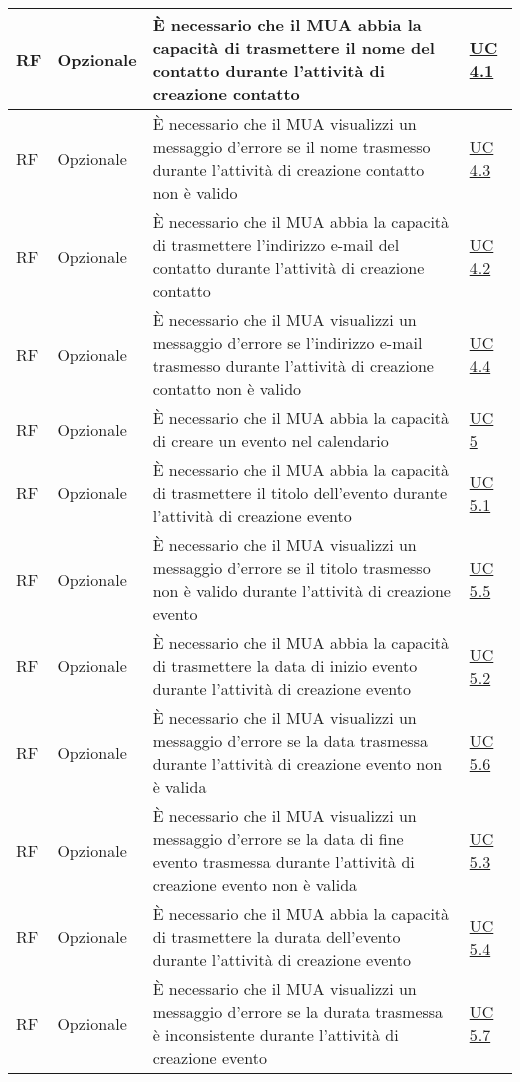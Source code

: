\begin{longtable}{*{1}{>{\centering\arraybackslash}p{1.5cm}}*{1}{>{\centering\arraybackslash}p{2.5cm}}p{6cm}*{1}{>{\centering\arraybackslash}p{3cm}}}
    \\\hline
    RF & Opzionale & È necessario che il MUA abbia la capacità di trasmettere il nome del contatto durante l'attività di creazione contatto & \hyperref[sec:UC4.1]{UC 4.1}
    \\\hline
    RF & Opzionale & È necessario che il MUA visualizzi un messaggio d'errore se il nome trasmesso durante l'attività di creazione contatto non è valido & \hyperref[sec:UC4.3]{UC 4.3}
    \\\hline
    RF & Opzionale & È necessario che il MUA abbia la capacità di trasmettere l'indirizzo e-mail del contatto durante l'attività di creazione contatto & \hyperref[sec:UC4.2]{UC 4.2}
    \\\hline
    RF & Opzionale & È necessario che il MUA visualizzi un messaggio d'errore se l'indirizzo e-mail trasmesso durante l'attività di creazione contatto non è valido & \hyperref[sec:UC4.4]{UC 4.4}
    \\\hline
    RF & Opzionale & È necessario che il MUA abbia la capacità di creare un evento nel calendario & \hyperref[sec:UC5]{UC 5}
    \\\hline
    RF & Opzionale & È necessario che il MUA abbia la capacità di trasmettere il titolo dell'evento durante l'attività di creazione evento & \hyperref[sec:UC5.1]{UC 5.1}
    \\\hline
    RF & Opzionale & È necessario che il MUA visualizzi un messaggio d'errore se il titolo trasmesso non è valido durante l'attività di creazione evento & \hyperref[sec:UC5.5]{UC 5.5}
    \\\hline
    RF & Opzionale & È necessario che il MUA abbia la capacità di trasmettere la data di inizio evento durante l'attività di creazione evento & \hyperref[sec:UC5.2]{UC 5.2}
    \\\hline
    RF & Opzionale & È necessario che il MUA visualizzi un messaggio d'errore se la data trasmessa durante l'attività di creazione evento non è valida & \hyperref[sec:UC5.6]{UC 5.6}
    \\\hline
    RF & Opzionale & È necessario che il MUA visualizzi un messaggio d'errore se la data di fine evento trasmessa durante l'attività di creazione evento non è valida & \hyperref[sec:UC5.3]{UC 5.3}
    \\\hline
    RF & Opzionale & È necessario che il MUA abbia la capacità di trasmettere la durata dell'evento durante l'attività di creazione evento & \hyperref[sec:UC5.4]{UC 5.4}
    \\\hline
    RF & Opzionale & È necessario che il MUA visualizzi un messaggio d'errore se la durata trasmessa è inconsistente durante l'attività di creazione evento & \hyperref[sec:UC5.7]{UC 5.7}

\end{longtable}
